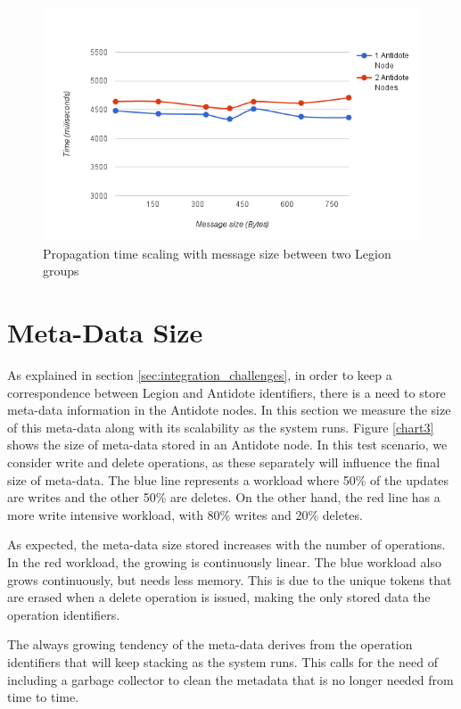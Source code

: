 \begin{figure}[h]
\centering
\includegraphics[scale=0.7]{files/chart5.png}
\caption{Propagation time scaling with message size between two Legion groups}
\label{chart5}
\end{figure}

\section{Meta-Data Size}
\label{sec:meta-data_size}
As explained in section \ref{sec:integration_challenges}, in order to keep a correspondence between Legion and Antidote identifiers, there is a need to store meta-data information in the Antidote nodes. In this section we measure the size of this meta-data along with its scalability as the system runs. Figure \ref{chart3} shows the size of meta-data stored in an Antidote node. In this test scenario, we consider write and delete operations, as these separately will influence the final size of meta-data. The blue line represents a workload where 50\% of the updates are writes and the other 50\% are deletes. On the other hand, the red line has a more write intensive workload, with 80\% writes and 20\% deletes.\par
	As expected, the meta-data size stored increases with the number of operations. In the red workload, the growing is continuously linear. The blue workload also grows continuously, but needs less memory. This is due to the unique tokens that are erased when a delete operation is issued, making the only stored data the operation identifiers.\par
	The always growing tendency of the meta-data derives from the operation identifiers that will keep stacking as the system runs. This calls for the need of including a garbage collector to clean the metadata that is no longer needed from time to time.

